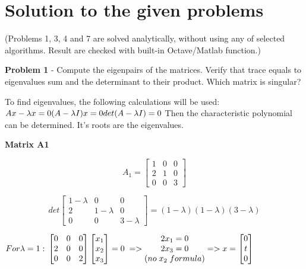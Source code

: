 \documentclass[eng,openany]{mgr}
\author{Jaroslaw M. Szumega}
\title{}
\date{21.03.2017}
\begin{document}
\maketitle
\tableofcontents
\newpage

\chapter{Solution to the given problems}
(Problems 1, 3, 4 and 7 are solved analytically, without using any of selected algorithms. Result are checked with built-in Octave/Matlab function.)

\textbf{Problem 1} - Compute the eigenpairs of the matrices. Verify that trace equals to eigenvalues sum and the determinant to their product. Which matrix is singular?

To find eigenvalues, the following calculations will be used:\\
\begin{math}
Ax - \lambda x = 0 \\
(A - \lambda I) x = 0 \\
det(A - \lambda I) = 0
\end{math}
Then the characteristic polynomial can be determined. It's roots are the eigenvalues.

\textbf{Matrix A1}

\[
A_1 =
\begin{bmatrix}
1 & 0 & 0  \\
2 & 1 & 0 \\
0 & 0 & 3 
\end{bmatrix}
\]

\[
det
\begin{bmatrix}
1 -\lambda & 0 & 0  \\
2 & 1-\lambda & 0 \\
0 & 0 & 3-\lambda 
\end{bmatrix}
=(1-\lambda)(1-\lambda)(3-\lambda)
\]

\begin{math}
For \lambda = 1:\\
\begin{bmatrix}
0 & 0 & 0  \\
2 & 0 & 0 \\
0 & 0 & 2 
\end{bmatrix}
\begin{bmatrix}
x_1 \\
x_2 \\
x_3
\end{bmatrix}
= 0\; =>
\begin{matrix}
2x_1 = 0\\
2x_3 = 0\\
(no\;x_2\;formula)
\end{matrix}
=>
x = 
\begin{bmatrix}
0\\
t \\
0
\end{bmatrix}
\end{math}
\end{document}
